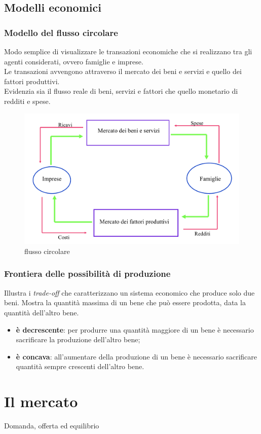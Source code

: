 \documentclass{report}
\begin{document}
	\section{Modelli economici}
	\subsection{Modello del flusso circolare}
	Modo semplice di visualizzare le transazioni economiche che si realizzano tra gli agenti considerati, ovvero famiglie e imprese.\medskip \\Le transazioni avvengono attraverso il mercato dei beni e servizi e quello dei fattori produttivi.\medskip \\Evidenzia sia il flusso reale di beni, servizi e fattori che quello monetario di redditi e spese.
	\begin{figure}[h]
		\centering
		\includegraphics[width=0.7\linewidth]{flusso-circolare}
		\caption{flusso circolare}
		\label{fig:flusso-circolare}
	\end{figure}
	\subsection{Frontiera delle possibilità di produzione}
	Illustra i \textit{trade-off} che caratterizzano un sistema economico che produce solo due beni. Mostra la quantità massima di un bene che può essere prodotta, data la quantità dell'altro bene.
	\begin{itemize}
		\item \textbf{è decrescente}: per produrre una quantità maggiore di un bene è necessario sacrificare la produzione dell'altro bene;
		\item \textbf{è concava}: all'aumentare della produzione di un bene è necessario sacrificare quantità sempre crescenti dell'altro bene.
	\end{itemize}
	\chapter{Il mercato}
	\large Domanda, offerta ed equilibrio
\end{document}
